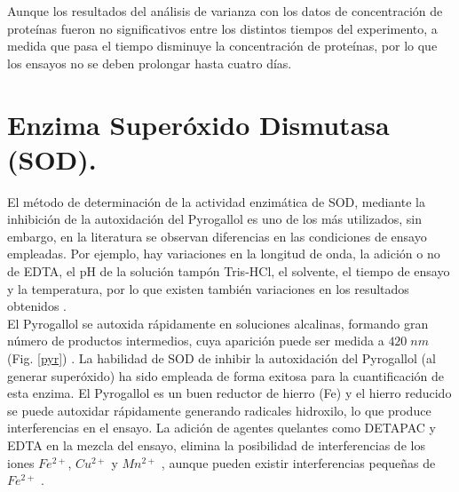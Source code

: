 Aunque los resultados del an\'alisis de varianza con los datos de concentración de proteínas fueron no significativos entre los distintos tiempos del experimento, a medida que pasa el tiempo disminuye la concentración de proteínas, por lo que los ensayos no se deben prolongar hasta cuatro d\'ias. \\

\section{Enzima Super\'oxido Dismutasa (SOD).}


El m\'etodo de determinaci\'on de la actividad enzim\'atica de SOD, mediante la inhibici\'on de la autoxidaci\'on del Pyrogallol es uno de los m\'as utilizados, sin embargo, en la literatura se observan diferencias en las condiciones de ensayo empleadas. Por ejemplo, hay variaciones en la longitud de onda, la adici\'on o no de EDTA, el pH de la soluci\'on tamp\'on Tris-HCl, el solvente, el tiempo de ensayo y la temperatura, por lo que existen tambi\'en variaciones en los resultados obtenidos \citep{zhang2016optimization}. \\

El Pyrogallol se autoxida r\'apidamente en soluciones alcalinas, formando gran n\'umero de productos intermedios, cuya aparici\'on puede ser medida a $420\;nm$ (Fig. \ref{pyr}) \citep{marklund1974involvement}. La habilidad de SOD de inhibir la autoxidaci\'on del Pyrogallol (al generar super\'oxido) ha sido empleada de forma exitosa para la cuantificaci\'on de esta enzima. El Pyrogallol es un buen reductor de hierro (Fe) y el hierro reducido se puede autoxidar r\'apidamente generando radicales hidroxilo, lo que produce interferencias en el ensayo. La adici\'on de agentes quelantes como DETAPAC y EDTA en la mezcla del ensayo, elimina la posibilidad de interferencias de los iones $Fe^{2+}$, $Cu^{2+}$ y $Mn^{2+}$ \citep{pandey2014oxidative}, aunque pueden existir interferencias peque\~nas de $Fe^{2+}$ \citep{misra1972role, marklund1974involvement}. \\

